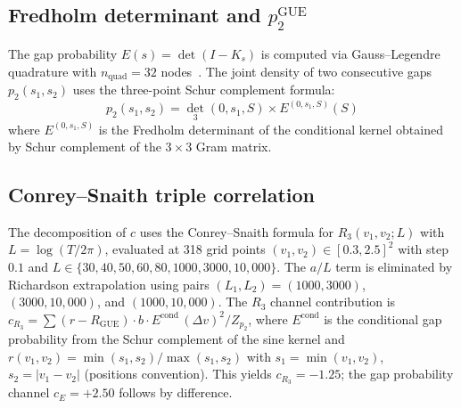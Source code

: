 \subsection*{Fredholm determinant and $p_2^{\mathrm{GUE}}$}

The gap probability $E(s) = \det(I - K_s)$ is computed via Gauss--Legendre
quadrature with $n_{\mathrm{quad}} = 32$ nodes~\cite{bornemann2010}.
The joint density of two consecutive gaps $p_2(s_1, s_2)$ uses the
three-point Schur complement formula:
\begin{equation}
p_2(s_1, s_2) = \det_3(0, s_1, S) \times E^{(0, s_1, S)}(S)
\end{equation}
where $E^{(0, s_1, S)}$ is the Fredholm determinant of the conditional kernel
obtained by Schur complement of the $3\times 3$ Gram matrix.

\subsection*{Conrey--Snaith triple correlation}

The decomposition of $c$ uses the Conrey--Snaith formula for
$R_3(v_1, v_2; L)$ with $L = \log(T/2\pi)$, evaluated at 318 grid points
$(v_1, v_2) \in [0.3, 2.5]^2$ with step $0.1$ and
$L \in \{30, 40, 50, 60, 80, 1000, 3000, 10{,}000\}$.
The $a/L$ term is eliminated by Richardson extrapolation using pairs
$(L_1, L_2) = (1000, 3000)$, $(3000, 10{,}000)$, and $(1000, 10{,}000)$.
The $R_3$ channel contribution is $c_{R_3} = \sum (r - R_{\mathrm{GUE}}) \cdot b
\cdot E^{\mathrm{cond}}\, (\Delta v)^2 / Z_{p_2}$, where $E^{\mathrm{cond}}$ is
the conditional gap probability from the Schur complement of the sine kernel
and $r(v_1, v_2) = \min(s_1, s_2)/\max(s_1, s_2)$ with $s_1 = \min(v_1, v_2)$,
$s_2 = |v_1 - v_2|$ (positions convention). This yields $c_{R_3} = -1.25$;
the gap probability channel $c_E = +2.50$ follows by difference.
